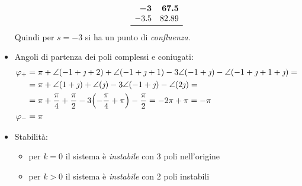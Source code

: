 \begin{itemize}
\[\begin{array}{rr}
			\bm{-3} & \bm{67.5} \\
			-3.5 & 82.89 \\
			\bottomrule
		\end{array}\]
		Quindi per \(s=-3\) si ha un punto di \emph{confluenza}.
	\item Angoli di partenza dei poli complessi e coniugati:
		\begin{align*}
			\varphi_+ &= \pi + \angle(-1+\jmath+2) + \angle(-1+\jmath+1) -3\angle(-1+\jmath) -\angle(-1+\jmath+1+\jmath) = \\
			&= \pi +\angle(1+\jmath) +\angle(\jmath) -3\angle(-1+\jmath) -\angle(2\jmath) = \\
			&= \pi + \frac{\pi}{4} + \frac{\pi}{2} -3\qty(-\frac{\pi}{4}+\pi) -\frac{\pi}{2} = -2\pi+\pi = -\pi \\
			\varphi_- &= \pi
		\end{align*}
	\item Stabilità: \begin{itemize}
			\item per \(k=0\) il sistema è \emph{instabile} con 3 poli nell'origine
			\item per \(k>0\) il sistema è \emph{instabile} con 2 poli instabili
		\end{itemize}
\end{itemize}

